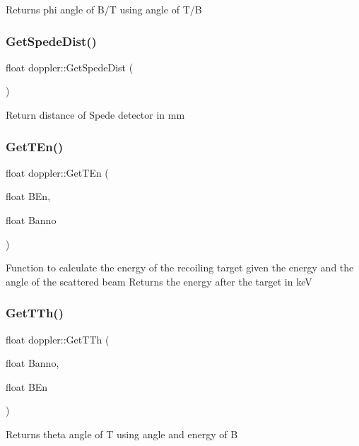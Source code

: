 Returns phi angle of B/T using angle of T/B \mbox{\label{classdoppler_ae45abdba9f375009cdeba5ac81d7b32c}} 
\subsubsection{\texorpdfstring{Get\+Spede\+Dist()}{GetSpedeDist()}}
{\footnotesize\ttfamily float doppler\+::\+Get\+Spede\+Dist (\begin{DoxyParamCaption}{ }\end{DoxyParamCaption})}

Return distance of Spede detector in mm \mbox{\label{classdoppler_a31a09afe8920dc1302162ec8e0be9302}} 
\subsubsection{\texorpdfstring{Get\+T\+En()}{GetTEn()}}
{\footnotesize\ttfamily float doppler\+::\+Get\+T\+En (\begin{DoxyParamCaption}\item[{float}]{B\+En,  }\item[{float}]{Banno }\end{DoxyParamCaption})}

Function to calculate the energy of the recoiling target given the energy and the angle of the scattered beam Returns the energy after the target in keV \mbox{\label{classdoppler_a7865dcf92a6b18d23cb48e9e624e505b}} 
\subsubsection{\texorpdfstring{Get\+T\+Th()}{GetTTh()}}
{\footnotesize\ttfamily float doppler\+::\+Get\+T\+Th (\begin{DoxyParamCaption}\item[{float}]{Banno,  }\item[{float}]{B\+En }\end{DoxyParamCaption})}

Returns theta angle of T using angle and energy of B \mbox{\label{classdoppler_a29e9a1565d90df9f5d9deef05cdbf53c}} 

